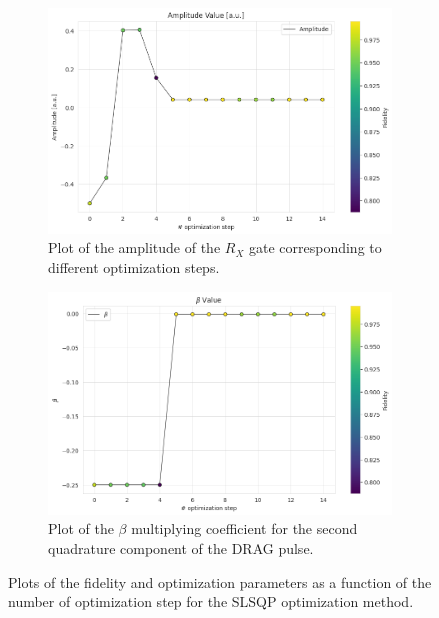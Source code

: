 \begin{figure}[h]
    \begin{subfigure}[t]{0.45\textwidth}
        \includegraphics[width=\textwidth]{figures/png/RB_optimization/SLSQP/amplitude.png}
        \caption{Plot of the amplitude of the $R_X$ gate corresponding to different optimization steps.}
        \label{fig:SLSQP:amplitude}
    \end{subfigure}
    \hfill
    \begin{subfigure}[t]{0.45\textwidth}
        \includegraphics[width=\textwidth]{figures/png/RB_optimization/SLSQP/beta.png}
        \caption{Plot of the $\beta$ multiplying coefficient for the second quadrature component of the DRAG pulse.}
        \label{fig:SLSQP:beta}
    \end{subfigure}

    \caption{Plots of the fidelity and optimization parameters as a function of the number of optimization step for the SLSQP optimization method.}
    \label{fig:SLSQP_plots}
\end{figure}


